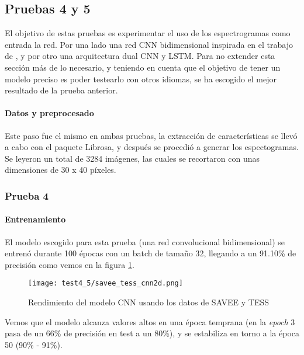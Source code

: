 \documentclass[11pt,a4paper,spanish]{book}
\begin{document}
	
	\subsection{Pruebas 4 y 5}
	El objetivo de estas pruebas es experimentar el uso de los espectrogramas como entrada la red. Por una lado una red CNN bidimensional inspirada en el trabajo de \cite{Mustaqeem2020}, y por otro una arquitectura dual CNN y LSTM. Para no extender esta sección más de lo necesario, y teniendo en cuenta que el objetivo de tener un modelo preciso es poder testearlo con otros idiomas, se ha escogido el mejor resultado de la prueba anterior.
	\paragraph{Datos y preprocesado}
	Este paso fue el mismo en ambas pruebas, la extracción de características  se llevó a cabo con el paquete Librosa, y después se procedió a generar los espectogramas. Se leyeron un total de 3284 imágenes, las cuales se recortaron con unas dimensiones de 30 x 40 píxeles.
	
	\subsubsection{Prueba 4}
	\paragraph{Entrenamiento}
	El modelo escogido para esta prueba (una red convolucional bidimensional) se entrenó durante 100 épocas con un batch de tamaño 32, llegando a un 91.10\% de precisión como vemos en la figura \ref{fig:cnn2d}. 
	\begin{figure}[H]
		\centering
		\texttt{[image: test4\_5/savee\_tess\_cnn2d.png]} 
		\caption{Rendimiento del modelo CNN usando los datos de SAVEE y TESS}
		\label{fig:cnn2d}
	\end{figure}

	Vemos que el modelo alcanza valores altos en una época temprana (en la \emph{epoch} 3  pasa de un 66\% de precisión en test a un 80\%), y se estabiliza en torno a la época 50 (90\% - 91\%).
	
\end{document}
